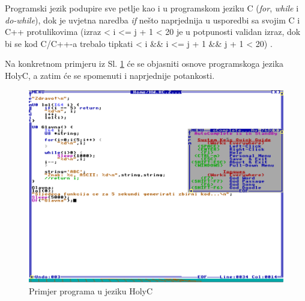 \documentclass{foi}
\begin{document}
Programski jezik podupire sve petlje kao i u programskom jeziku C (\emph{for}, \emph{while} i \emph{do-while}), dok je uvjetna naredba \emph{if} nešto naprjednija u usporedbi sa svojim C i C++ protulikovima (izraz { < i <= j + 1 < 20} je u potpunosti validan izraz, dok bi se kod C/C++-a trebalo tipkati { < i \&\& i <= j + 1 \&\& j + 1 < 20}) \cite{HolyC}.

Na konkretnom primjeru iz Sl. \ref{fig:helloworld} će se objasniti osnove programskoga jezika HolyC, a zatim će se spomenuti i naprjednije potankosti.

\begin{figure}[H]
    \centering
    \includegraphics[width=1.0\textwidth]{slike/helloworld.png}
    \caption{Primjer programa u jeziku HolyC}
    \label{fig:helloworld}
\end{figure}
\end{document}

